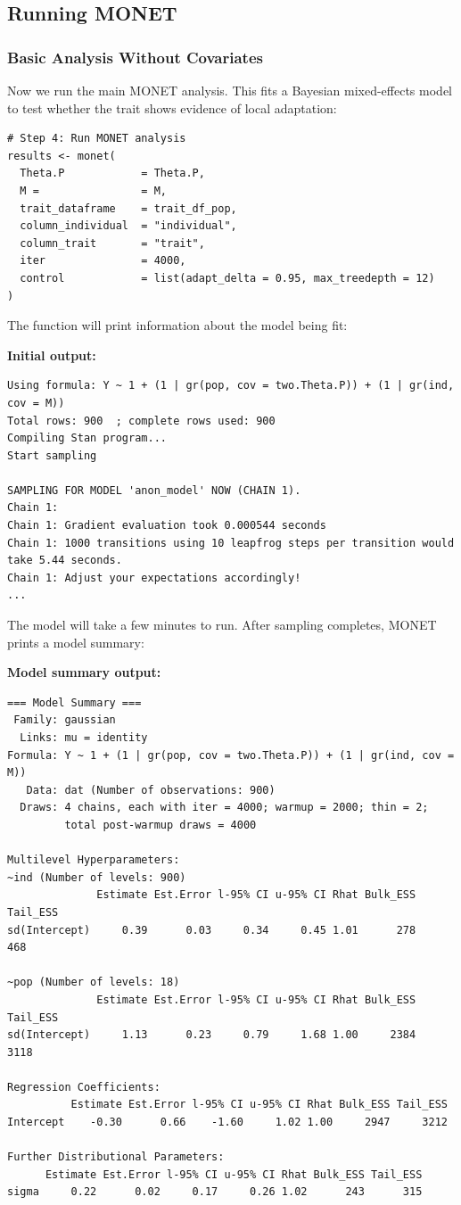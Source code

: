 \documentclass[11pt]{article}
\begin{document}
\subsection{Running MONET}

\subsubsection{Basic Analysis Without Covariates}

Now we run the main MONET analysis. This fits a Bayesian mixed-effects model to test whether the trait shows evidence of local adaptation:

\begin{lstlisting}
# Step 4: Run MONET analysis
results <- monet(
  Theta.P            = Theta.P,
  M =                = M,
  trait_dataframe    = trait_df_pop,
  column_individual  = "individual",
  column_trait       = "trait",
  iter               = 4000,                
  control            = list(adapt_delta = 0.95, max_treedepth = 12)  
)
\end{lstlisting}

The function will print information about the model being fit:

\textbf{Initial output:}
\begin{verbatim}
Using formula: Y ~ 1 + (1 | gr(pop, cov = two.Theta.P)) + (1 | gr(ind, cov = M)) 
Total rows: 900  ; complete rows used: 900 
Compiling Stan program...
Start sampling

SAMPLING FOR MODEL 'anon_model' NOW (CHAIN 1).
Chain 1: 
Chain 1: Gradient evaluation took 0.000544 seconds
Chain 1: 1000 transitions using 10 leapfrog steps per transition would take 5.44 seconds.
Chain 1: Adjust your expectations accordingly!
...
\end{verbatim}

The model will take a few minutes to run. After sampling completes, MONET prints a model summary:

\textbf{Model summary output:}
\begin{verbatim}
=== Model Summary ===
 Family: gaussian 
  Links: mu = identity 
Formula: Y ~ 1 + (1 | gr(pop, cov = two.Theta.P)) + (1 | gr(ind, cov = M)) 
   Data: dat (Number of observations: 900) 
  Draws: 4 chains, each with iter = 4000; warmup = 2000; thin = 2;
         total post-warmup draws = 4000

Multilevel Hyperparameters:
~ind (Number of levels: 900) 
              Estimate Est.Error l-95% CI u-95% CI Rhat Bulk_ESS Tail_ESS
sd(Intercept)     0.39      0.03     0.34     0.45 1.01      278      468

~pop (Number of levels: 18) 
              Estimate Est.Error l-95% CI u-95% CI Rhat Bulk_ESS Tail_ESS
sd(Intercept)     1.13      0.23     0.79     1.68 1.00     2384     3118

Regression Coefficients:
          Estimate Est.Error l-95% CI u-95% CI Rhat Bulk_ESS Tail_ESS
Intercept    -0.30      0.66    -1.60     1.02 1.00     2947     3212

Further Distributional Parameters:
      Estimate Est.Error l-95% CI u-95% CI Rhat Bulk_ESS Tail_ESS
sigma     0.22      0.02     0.17     0.26 1.02      243      315
\end{verbatim}
\end{document}
